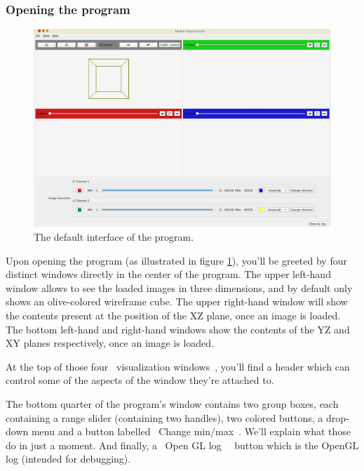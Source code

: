 {	\subsubsection*{Opening the program}
	{
		\begin{figure}[h]
			\label{figure:program_ui_00}
			\centering
			\includegraphics[width=.75\textwidth]{img/program_00.png}
			\caption{The default interface of the program.}
		\end{figure}\par
		Upon opening the program (as illustrated in figure \ref{figure:program_ui_00}), you'll be greeted by four distinct windows directly in the center of the program. The upper left-hand window allows to see the loaded images in three dimensions, and by default only shows an olive-colored wireframe cube. The upper right-hand window will show the contents present at the position of the XZ plane, once an image is loaded. The bottom left-hand and right-hand windows show the contents of the YZ and XY planes respectively, once an image is loaded.\par
		At the top of those four \guillemotleft{}~visualization windows~\guillemotright{}, you'll find a header which can control some of the aspects of the window they're attached to.\par\myparspace
		The bottom quarter of the program's window contains two group boxes, each containing a range slider (containing two handles), two colored buttons, a drop-down menu and a button labelled \guillemotleft{}~Change min/max~\guillemotright{}. We'll explain what those do in just a moment. And finally, a \guillemotleft{}~Open GL log~\guillemotright{}~ button which is the OpenGL log (intended for debugging).\par
		\myparspace
	}

}
